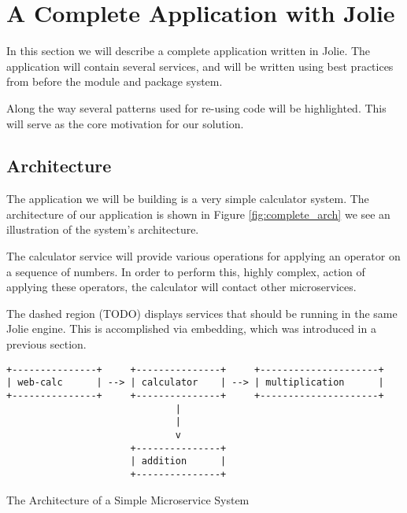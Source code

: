 \section{A Complete Application with Jolie}
\label{sec:complete}

In this section we will describe a complete application written in Jolie. The
application will contain several services, and will be written using best
practices from before the module and package system.

Along the way several patterns used for re-using code will be highlighted. This
will serve as the core motivation for our solution.

\subsection{Architecture}

%

The application we will be building is a very simple calculator system. The
architecture of our application is shown in Figure \ref{fig:complete_arch} we
see an illustration of the system's architecture.

The calculator service will provide various operations for applying an operator
on a sequence of numbers. In order to perform this, highly complex, action of
applying these operators, the calculator will contact other microservices.

The dashed region (TODO) displays services that should be running in the same
Jolie engine. This is accomplished via embedding, which was introduced in a
previous section.

\begin{listing}[H]
\begin{verbatim}
+---------------+     +---------------+     +---------------------+
| web-calc      | --> | calculator    | --> | multiplication      |
+---------------+     +---------------+     +---------------------+
                              |
                              |
                              v
                      +---------------+
                      | addition      |
                      +---------------+
\end{verbatim}
\caption{The Architecture of a Simple Microservice System}
\label{fig:complete_arch}
\end{listing}


